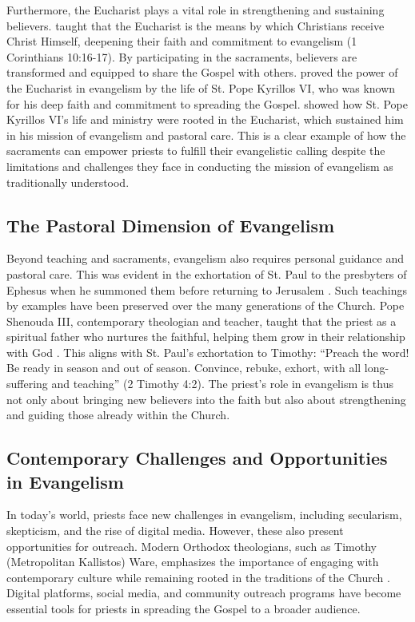 \documentclass[12pt, doc]{apa7}   	%
\begin{document}
Furthermore, the Eucharist plays a vital role in strengthening and sustaining believers. \citet{st_basil_letters} taught that the Eucharist is the means by which Christians receive Christ Himself, deepening their faith and commitment to evangelism (1 Corinthians 10:16-17). By participating in the sacraments, believers are transformed and equipped to share the Gospel with others.  \citet{fanous_silent_patriarch} proved the power of the Eucharist in evangelism by the life of St. Pope Kyrillos VI, who was known for his deep faith and commitment to spreading the Gospel.  \citeauthor{fanous_silent_patriarch} showed how St. Pope Kyrillos VI’s life and ministry were rooted in the Eucharist, which sustained him in his mission of evangelism and pastoral care.  This is a clear example of how the sacraments can empower priests to fulfill their evangelistic calling despite the limitations and challenges they face in conducting the mission of evangelism as traditionally understood.

\subsection{The Pastoral Dimension of Evangelism}

Beyond teaching and sacraments, evangelism also requires personal guidance and pastoral care.  This was evident in the exhortation of St. Paul to the presbyters of Ephesus when he summoned them before returning to Jerusalem \citep{paul_wright}.  Such teachings by examples have been preserved over the many generations of the Church. Pope Shenouda III, contemporary theologian and teacher, taught that the priest as a spiritual father who nurtures the faithful, helping them grow in their relationship with God \citep{priesthood_shenouda}. This aligns with St. Paul’s exhortation to Timothy: “Preach the word! Be ready in season and out of season. Convince, rebuke, exhort, with all long-suffering and teaching” (2 Timothy 4:2). The priest’s role in evangelism is thus not only about bringing new believers into the faith but also about strengthening and guiding those already within the Church.

\subsection{Contemporary Challenges and Opportunities in Evangelism}

In today’s world, priests face new challenges in evangelism, including secularism, skepticism, and the rise of digital media. However, these also present opportunities for outreach. Modern Orthodox theologians, such as Timothy (Metropolitan Kallistos) Ware, emphasizes the importance of engaging with contemporary culture while remaining rooted in the traditions of the Church \citep{orthodox_church_ware}. Digital platforms, social media, and community outreach programs have become essential tools for priests in spreading the Gospel to a broader audience.
\end{document}
